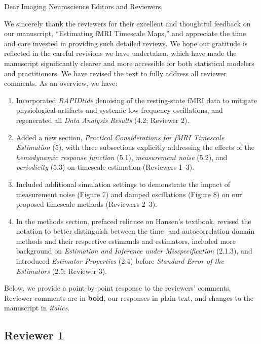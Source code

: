 \documentclass[docs/main.tex]{subfiles}
\begin{document}
Dear Imaging Neuroscience Editors and Reviewers,

\vspace{0.5cm}

We sincerely thank the reviewers for their excellent and thoughtful feedback on our manuscript, ``Estimating fMRI Timescale Maps,'' and appreciate the time and care invested in providing such detailed reviews. We hope our gratitude is reflected in the careful revisions we have undertaken, which have made the manuscript significantly clearer and more accessible for both statistical modelers and practitioners. We have revised the text to fully address all reviewer comments. As an overview, we have:

\begin{enumerate}
    \item Incorporated \textit{RAPIDtide} denoising of the resting-state fMRI data to mitigate physiological artifacts and systemic low-frequency oscillations, and regenerated all \textit{Data Analysis Results} (4.2; Reviewer 2).
    \item Added a new section, \textit{Practical Considerations for fMRI Timescale Estimation} (5), with three subsections explicitly addressing the effects of the \textit{hemodynamic response function} (5.1), \textit{measurement noise} (5.2), and \textit{periodicity} (5.3) on timescale estimation (Reviewers 1–3).
    \item Included additional simulation settings to demonstrate the impact of measurement noise (Figure 7) and damped oscillations (Figure 8) on our proposed timescale methods (Reviewers 2–3).
    \item In the methods section, prefaced reliance on Hansen’s textbook, revised the notation to better distinguish between the time- and autocorrelation-domain methods and their respective estimands and estimators, included more background on \textit{Estimation and Inference under Misspecification} (2.1.3), and introduced \textit{Estimator Properties} (2.4) before \textit{Standard Error of the Estimators} (2.5; Reviewer 3).
\end{enumerate}

\vspace{0.5cm}

Below, we provide a point-by-point response to the reviewers’ comments. Reviewer comments are in \textbf{bold}, our responses in plain text, and changes to the manuscript in \textit{italics}.

\subsection*{Reviewer 1}
\end{document}
